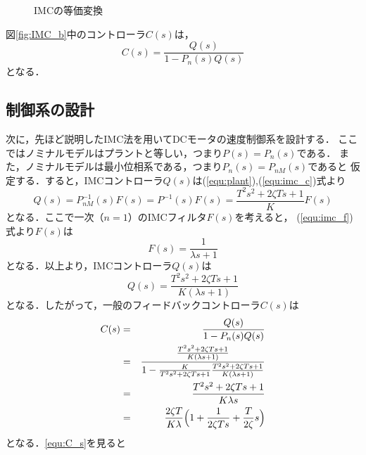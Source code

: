 \documentclass[a4paper,12pt]{jarticle}
\begin{document}
\begin{figure}[tbp]
  \begin{center} 
  \hfill
  \end{center}
  \caption{IMCの等価変換}
  \label{fig:henkan}
\end{figure}
%
図\ref{fig:IMC_b}中のコントローラ$C(s)$は，
%
\begin{equation}
 C(s) = \frac{Q(s)}{1 - P_n(s)Q(s)}
\end{equation}
%
となる．
\subsection{制御系の設計}
次に，先ほど説明したIMC法を用いてDCモータの速度制御系を設計する．
ここではノミナルモデルはプラントと等しい，つまり$P(s)=P_{n}(s)$である．
また，ノミナルモデルは最小位相系である，つまり$P_n(s)=P_{nM}(s)$であると
仮定する．すると，IMCコントローラ$Q(s)$は(\ref{equ:plant}),(\ref{equ:imc_c})式より
%
\begin{equation}
 Q(s) = P_{nM}^{-1}(s)F(s) = P^{-1}(s)F(s) = \frac{T^2s^2+2\zeta Ts+1}{K}F(s) 
\end{equation}
%
となる．ここで一次（$n=1$）のIMCフィルタ$F(s)$を考えると，
(\ref{equ:imc_f})式より$F(s)$は
%
\begin{equation}
 F(s) = \frac{1}{\lambda s + 1}
\end{equation}
%
となる．以上より，IMCコントローラ$Q(s)$は
%
\begin{equation}
 Q(s) = \frac{T^2s^2+2\zeta Ts+1}{K(\lambda s + 1)}
\end{equation}
%
となる．したがって，一般のフィードバックコントローラ$C(s)$は
%
\begin{eqnarray}\label{equ:C_s}
 C(s) & = & \frac{Q(s)}{1 - P_n(s)Q(s)} \nonumber  \\ 
  & = & \frac{\frac{T^2s^2+2\zeta Ts+1}{K(\lambda s +
  1)}}{1-\frac{K}{T^2s^2+2\zeta Ts+1}\frac{T^2s^2+2\zeta Ts+1}{K(\lambda
  s + 1)}} \nonumber \\ 
 & = & \frac{T^2s^2+2\zeta Ts+1}{K\lambda s} \nonumber  \\
  & = & \frac{2\zeta T}{K\lambda}\Bigl(1+\frac{1}{2\zeta Ts}+\frac{T}{2\zeta}s\Bigr)
\end{eqnarray}
%
となる．\ref{equ:C_s}を見ると
\end{document}
